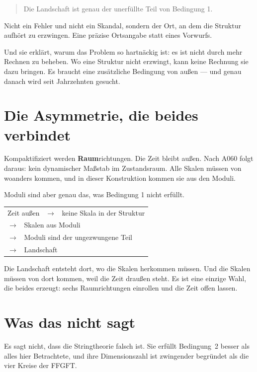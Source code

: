 \begin{quote}
Die Landschaft ist genau der unerfüllte Teil von Bedingung 1.
\end{quote}

Nicht ein Fehler und nicht ein Skandal, sondern der Ort, an dem die
Struktur aufhört zu erzwingen. Eine präzise Ortsangabe statt eines
Vorwurfs.

Und sie erklärt, warum das Problem so hartnäckig ist: es ist nicht
durch mehr Rechnen zu beheben. Wo eine Struktur nicht erzwingt, kann
keine Rechnung sie dazu bringen. Es braucht eine zusätzliche Bedingung
von außen --- und genau danach wird seit Jahrzehnten gesucht.

\section{Die Asymmetrie, die beides verbindet}

Kompaktifiziert werden \textbf{Raum}richtungen. Die Zeit bleibt außen.
Nach A060 folgt daraus: kein dynamischer Maßstab im Zustandsraum. Alle
Skalen müssen von woanders kommen, und in dieser Konstruktion kommen
sie aus den Moduli.

Moduli sind aber genau das, was Bedingung 1 nicht erfüllt.
\begin{center}
\begin{tabular}{l}
Zeit außen \ $\to$ \ keine Skala in der Struktur \\
\phantom{Zeit außen} $\to$ \ Skalen aus Moduli \\
\phantom{Zeit außen} $\to$ \ Moduli sind der ungezwungene Teil \\
\phantom{Zeit außen} $\to$ \ Landschaft \\
\end{tabular}
\end{center}

Die Landschaft entsteht dort, wo die Skalen herkommen müssen. Und die
Skalen müssen von dort kommen, weil die Zeit draußen steht. Es ist eine
einzige Wahl, die beides erzeugt: sechs Raumrichtungen einrollen und
die Zeit offen lassen.

\section{Was das nicht sagt}

Es sagt nicht, dass die Stringtheorie falsch ist. Sie erfüllt
Bedingung~2 besser als alles hier Betrachtete, und ihre Dimensionszahl
ist zwingender begründet als die vier Kreise der FFGFT.

